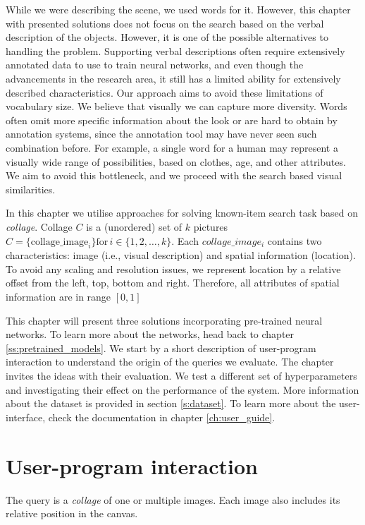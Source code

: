 While we were describing the scene, we used words for it. However, this chapter with presented solutions does not focus on the search based on the verbal description of the objects. However, it is one of the possible alternatives to handling the problem. Supporting verbal descriptions often require extensively annotated data to use to train neural networks, and even though the advancements in the research area, it still has a limited ability for extensively described characteristics. Our approach aims to avoid these limitations of vocabulary size. We believe that visually we can capture more diversity. Words often omit more specific information about the look or are hard to obtain by annotation systems, since the annotation tool may have never seen such combination before. For example, a single word for a human may represent a visually wide range of possibilities, based on clothes, age, and other attributes. We aim to avoid this bottleneck, and we proceed with the search based visual similarities.


In this chapter we utilise approaches for solving known-item search task based on \emph{collage}. Collage $C$ is a (unordered) set of $k$ pictures $C = \{\text{collage\_image}_i\} \text{for}\, i \in \{1, 2, \dots, k\} $.  Each $collage\_image_i$ contains two characteristics: image (i.e., visual description) and spatial information (location). To avoid any scaling and resolution issues, we represent location by a relative offset from the left, top, bottom and right. Therefore, all attributes of spatial information are in range $[0,1]$

This chapter will present three solutions incorporating pre-trained neural networks. To learn more about the networks, head back to chapter \ref{ss:pretrained_models}. We start by a short description of user-program interaction to understand the origin of the queries we evaluate. The chapter invites the ideas with their evaluation. We test a different set of hyperparameters and investigating their effect on the performance of the system. More information about the dataset is provided in section \ref{s:dataset}. To learn more about the user-interface, check the documentation in chapter \ref{ch:user_guide}. 


\section{User-program interaction}

The query is a \emph{collage} of one or multiple images. Each image also includes its relative position in the canvas.

